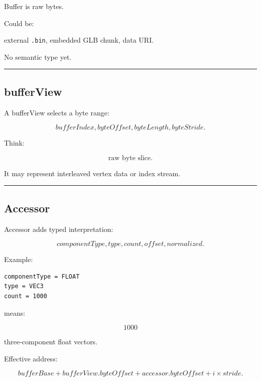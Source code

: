 \hypertarget{04-visual-computing-ii-ch041-buffers}{}

Buffer is raw bytes.

Could be:

external \texttt{.bin}, embedded GLB chunk, data URI.

No semantic type yet.

\begin{center}\rule{0.5\linewidth}{0.5pt}\end{center}

\subsection{bufferView}\label{04-visual-computing-ii-ch041-bufferview}

\hypertarget{04-visual-computing-ii-ch041-bufferview}{}

A bufferView selects a byte range:

\[
bufferIndex,
byteOffset,
byteLength,
byteStride.
\]

Think:

\[
\boxed{
\text{raw byte slice}.
}
\]

It may represent interleaved vertex data or index stream.

\begin{center}\rule{0.5\linewidth}{0.5pt}\end{center}

\subsection{Accessor}\label{04-visual-computing-ii-ch041-accessor}

\hypertarget{04-visual-computing-ii-ch041-accessor}{}

Accessor adds typed interpretation:

\[
componentType,
type,
count,
offset,
normalized.
\]

Example:

\begin{verbatim}
componentType = FLOAT
type = VEC3
count = 1000
\end{verbatim}

means:

\[
1000
\]

three-component float vectors.

Effective address:

\[
\boxed{
bufferBase
+
bufferView.byteOffset
+
accessor.byteOffset
+
i\times stride.
}
\]

